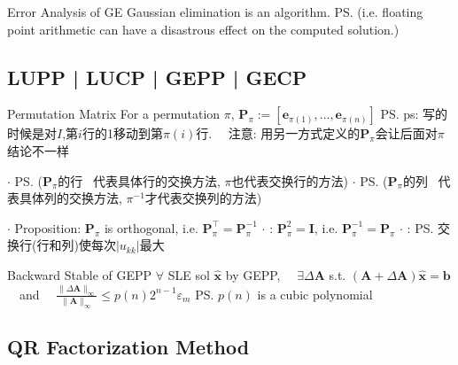 \documentclass{note}
\begin{document}
\begin{MyTh}{Error Analysis of GE}
  Gaussian elimination is an  algorithm. \ps{(i.e. floating point arithmetic can have a disastrous effect on the computed solution.)}
\end{MyTh}


\subsection{LUPP | LUCP | GEPP | GECP}

\begin{MyTh}{Permutation Matrix}
    For a permutation $\pi$, $\mathbf{P}_\pi:=[\mathbf{e}_{\pi(1)}, \dots, \mathbf{e}_{\pi(n)}]$ \quad \ps{\tiny ps: 写的时候是对$I$,第$i$行的1移动到第$\pi(i)$行. \ \ 注意: 用另一方式定义的$\mathbf{P}_\pi$会让后面对$\pi$结论不一样}
    
    \quad $\cdot$  \ps{($\mathbf{P}_\pi$的行 \ 代表具体行的交换方法, $\pi$也代表交换行的方法)} \qquad $\cdot$  \ps{($\mathbf{P}_\pi$的列 \ 代表具体列的交换方法, $\pi^{-1}$才代表交换列的方法)}

    \quad $\cdot$ Proposition: $\mathbf{P}_\pi$ is orthogonal, i.e. $\mathbf{P}_\pi^\top=\mathbf{P}_\pi^{-1}$
    \quad $\cdot$ : $\mathbf{P}_\pi^2=\mathbf{I}$, i.e. $\mathbf{P}_\pi^{-1}=\mathbf{P}_\pi$
    \quad $\cdot$ : {\tiny \ps{交换行(行和列)使每次$|u_{kk}|$最大}}
\end{MyTh}

\begin{MyTh}{Backward Stable of GEPP}
  $\forall$ SLE sol $\widehat{\mathbf{x}}$ by GEPP, \ \ $\exists \Delta \mathbf{A}$ s.t. $(\mathbf{A} + \Delta \mathbf{A})\widehat{\mathbf{x}} = \mathbf{b}$ \ \ and \ \ $\frac{\|\Delta \mathbf{A}\|_{\infty}}{\|\mathbf{A}\|_{\infty}} \leq p(n) 2^{n-1}\varepsilon_m$ \ps{$p(n)$ is a cubic polynomial}
\end{MyTh}


\subsection{QR Factorization Method}
\end{document}
